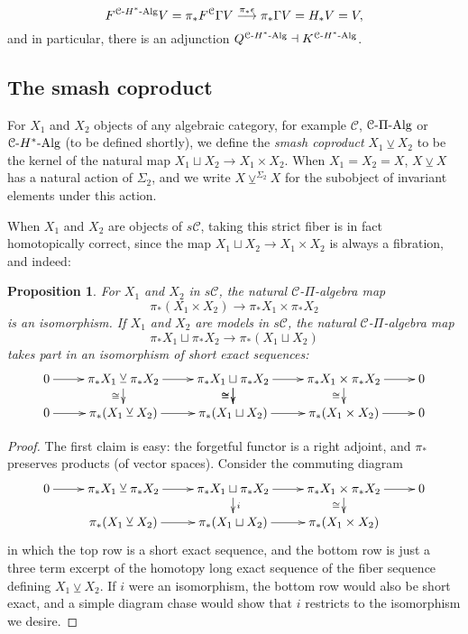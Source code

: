 \documentclass[11pt]{amsart}
\theoremstyle{plain}
\newtheorem{prop}[thm]{Proposition}
\theoremstyle{definition}
\renewcommand{\to}{\longrightarrow}
\newcommand{\calC}{\mathcal{C}}
\newcommand{\calc}{\mathcal{C}}
\theoremstyle{plain}
\newcommand{\PiAlg}{\textup{-$\Pi$-Alg}}
\newcommand{\HAlg}{\textup{-$H^*$-Alg}}
\newcommand{\smashcoprod}{\veebar}%
\begin{document}
\begin{CPiAlgs and CHalgs}
\[F^{\calc\HAlg}V=\pi_*F^\calc\Gamma V\overset{\pi_*\epsilon}{\to}\pi_*\Gamma V=H_*V=V,\]
and in particular, there is an adjunction $Q^{\calc\HAlg}\dashv K^{\calc\HAlg}$.

\subsection{The smash coproduct}\label{subseq:The smash coproduct}
For $X_1$ and $X_2$ objects of any algebraic category, for example $\calC$, $\calC\PiAlg$ or $\calC\HAlg$ (to be defined shortly), we define the \emph{smash coproduct} $X_1\smashcoprod X_2$ to be the kernel of the natural map $X_1\sqcup X_2\to X_1\times X_2$. When $X_1=X_2=X$, $X\smashcoprod X$ has a natural action of $\Sigma_2$, and we write $X\smashcoprod^{\Sigma_2} X$ for the subobject of invariant elements under this action.

When $X_1$ and $X_2$ are  objects of $s\calc$, taking this strict fiber is in fact homotopically correct, since the map $X_1\sqcup X_2\to X_1\times X_2$ is always a fibration, and indeed:
\begin{prop}\label{smash coprod}
For $X_1$ and $X_2$ in $s\calc$, the natural $\calC$-$\Pi$-algebra map
\[\pi_*(X_1\times X_2)\to \pi_* X_1\times \pi_* X_2\]
 is an isomorphism. If $X_1$ and $X_2$ are models in $s\calc$, the natural $\calC$-$\Pi$-algebra map 
\[\pi_* X_1\sqcup \pi_* X_2\to\pi_*(X_1\sqcup X_2)\]
takes part in an isomorphism of short exact sequences:
\[\xymatrix@R=4mm{
0\ar[r]&%
\pi_* X_1\smashcoprod \pi_* X_2
\ar[r]\ar[d]_-{\cong}
&%
\pi_* X_1\sqcup \pi_* X_2
\ar[r]
\ar[d]_-{\cong}\ar[d]_-{\cong}
&%
\pi_* X_1\times \pi_* X_2
\ar[r]
\ar[d]_-{\cong}
&%
0\\%
0\ar[r]&%
\pi_* (X_1\smashcoprod  X_2)
\ar[r]
&%
\pi_* (X_1\sqcup X_2)
\ar[r]
&%
\pi_* (X_1\times X_2)
\ar[r]&0
}\]
\end{prop}
\begin{proof}
The first claim is easy: the forgetful functor is a right adjoint, and $\pi_*$ preserves products (of vector spaces). Consider the commuting diagram
\[\xymatrix@R=4mm{
0\ar[r]&%
\pi_* X_1\smashcoprod \pi_* X_2
\ar[r]
&%
\pi_* X_1\sqcup \pi_* X_2
\ar[r]
\ar[d]^-{i}
&%
\pi_* X_1\times \pi_* X_2
\ar[r]
\ar[d]_-{\cong}
&%
0\\%
&%
\pi_* (X_1\smashcoprod  X_2)
\ar[r]
&%
\pi_* (X_1\sqcup X_2)
\ar[r]
&%
\pi_* (X_1\times X_2)
}\]
in which the top row is a short exact sequence, and the bottom row is just a three term excerpt of the homotopy long exact sequence of the fiber sequence defining $X_1\smashcoprod X_2$. If $i$ were an isomorphism, the bottom row would also be short exact, and a simple diagram chase would show that $i$ restricts to the isomorphism we desire.



\end{proof}
\end{CPiAlgs and CHalgs}
\end{document}
